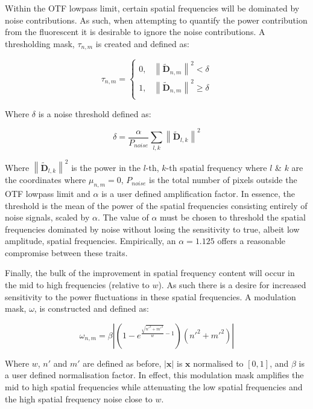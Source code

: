 Within the OTF lowpass limit, certain spatial frequencies will be dominated
by noise contributions. As such, when attempting to quantify the power 
contribution from the fluorescent it is desirable to ignore the noise
contributions. A thresholding mask, $\tau_{n,m}$ is created and defined as:

\begin{equation}\label{eq:noise_threshold_mask}
\tau_{n,m} = 
\begin{cases}
0, & \left\| \tilde{\textbf{D}}_{n,m} \right\|^2 < \delta\\
1, & \left\| \tilde{\textbf{D}}_{n,m} \right\|^2 \ge \delta\\ 
\end{cases}
\end{equation}

Where $\delta$ is a noise threshold defined as:

\begin{equation}\label{eq:noise_threshold}
\delta = \frac{\alpha}{P_{noise}}\sum\limits_{l,k}{\left\| \tilde{\textbf{D}}_{l,k} \right\|^2}
\end{equation}

Where $\left\| \tilde{\textbf{D}}_{l,k} \right\|^2$ is the power in the 
$l$-th, $k$-th spatial frequency where $l$ \& $k$ are the coordinates 
where $\mu_{n,m} = 0$, $P_{noise}$ is the total number of pixels 
outside the OTF lowpass limit and $\alpha$ is a user defined 
amplification factor. In essence, the threshold is the mean of the
power of the spatial frequencies consisting entirely of noise signals,
scaled by $\alpha$.	The value of $\alpha$ must be chosen to threshold
the spatial frequencies dominated by noise without losing the sensitivity
to true, albeit low amplitude, spatial frequencies. Empirically, an 
$\alpha = 1.125$ offers a reasonable compromise between these traits.

Finally, the bulk of the improvement in spatial frequency content will
occur in the mid to high frequencies (relative to $w$). As such there is 
a desire for increased sensitivity to the power fluctuations in these 
spatial frequencies. A modulation mask, $\omega$, is constructed and 
defined as:

\begin{equation}\label{eq:attenuation_mask_norm_and_scaled}
\omega_{n,m} = \beta \left| \left(1 - e^{\frac{\sqrt{n'^{2} + m'^{2}}}{w}-1}\right) \left(n'^{2} + m'^{2}\right) \right|
\end{equation}

Where $w$, $n'$ and $m'$ are defined as before, $\left| \textbf{x} \right|$ 
is $\textbf{x}$ normalised to $[0,1]$, and $\beta$ is a user defined 
normalisation factor. In effect, this modulation mask amplifies the mid 
to high spatial frequencies while attenuating the low spatial frequencies 
and the high spatial frequency noise close to $w$.

